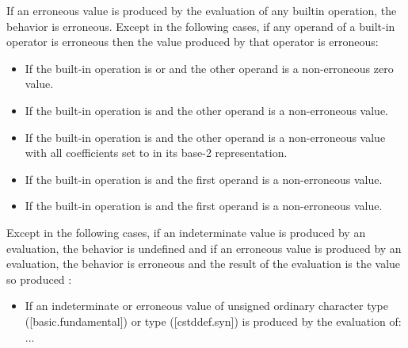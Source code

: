 \begin{adjustwidth}{0.5cm}{0.5cm}
\begin{addedblock}
If an erroneous value is produced by the evaluation of any builtin operation, the behavior is erroneous. Except in the following cases, if any operand of a built-in operator is erroneous then the value
produced by that operator is erroneous:
\begin{itemize}
\item  If the built-in operation is \tcode{*} or \tcode{\&} and the other operand is a non-erroneous zero value.
\item  If the built-in operation is \tcode{\%} and the other operand is a non-erroneous  value.
\item  If the built-in operation is \tcode{|} and the other operand is a non-erroneous value with all coefficients set to  in its base-2 representation.
\item  If the built-in operation is \tcode{\&\&} and the first operand is a non-erroneous  value.
\item  If the built-in operation is \tcode{||} and the first operand is a non-erroneous  value.
\end{itemize}
\end{addedblock}

Except in the following cases, if an indeterminate value is produced by an evaluation,
the behavior is undefined  and if an erroneous value is produced by an evaluation, the behavior is erroneous and
the result of the evaluation is the value so produced 
:
\begin{itemize}
\item If an indeterminate or erroneous value of unsigned ordinary character type ([basic.\allowbreak{}fundamental]) or  type ([cstddef.syn]) is produced by the evaluation of:  \\ ...
\end{itemize}
\end{adjustwidth}




\pagebreak
\renewcommand{\bibname}{References}  %






